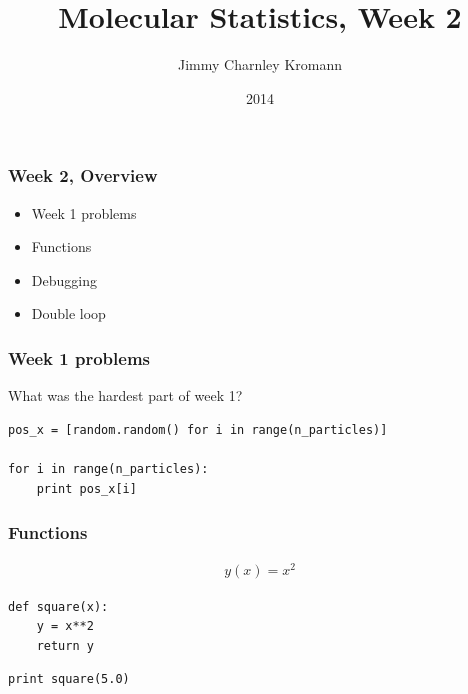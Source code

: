 \documentclass{beamer}
\title[]{Molecular Statistics, Week 2}
\institute[University of Copenhagen]{Department of Chemistry \\ University of Copenhagen}
\author[Jimmy Charnley Kromann]{Jimmy Charnley Kromann}
\date{2014}
\begin{document}
\frame[plain]{\titlepage}


\begin{frame}[fragile]

    \frametitle{Week 2, Overview}

    \begin{itemize}
        \item Week 1 problems
        \item Functions
        \item Debugging
        \item Double loop
    \end{itemize}

\end{frame}


\begin{frame}[fragile]

    \frametitle{Week 1 problems}

    What was the hardest part of week 1?\\

    \bigskip

\begin{lstlisting}
pos_x = [random.random() for i in range(n_particles)]

for i in range(n_particles):
    print pos_x[i]

\end{lstlisting}


\end{frame}



\begin{frame}[fragile]

    \frametitle{Functions}

    \begin{align*}
        y(x) = x^2
    \end{align*}

    \bigskip
    \bigskip

\begin{lstlisting}
def square(x):
    y = x**2
    return y

\end{lstlisting}

\begin{lstlisting}
print square(5.0)

\end{lstlisting}



\end{frame}
\end{document}
